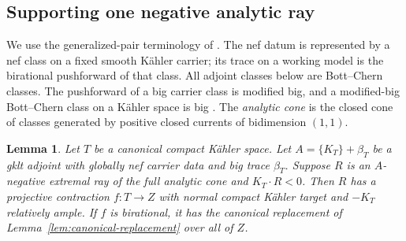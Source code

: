 \documentclass[11pt,a4paper]{article}
\numberwithin{equation}{section}
\newtheorem{lemma}[theorem]{Lemma}
\theoremstyle{definition}
\theoremstyle{remark}
\begin{document}
\subsection{Supporting one negative analytic ray}

We use the generalized-pair terminology of \cite{HX2026,OAI034}.
The nef datum is represented by a nef class on a fixed smooth
Kähler carrier; its trace on a working model is the birational
pushforward of that class. All adjoint classes below are
Bott--Chern classes. The pushforward of a big carrier class is
modified big, and a modified-big Bott--Chern class on a Kähler
space is big \cite[Definition~2.8]{HX2026}.
The \emph{analytic cone} is the closed cone of classes generated
by positive closed currents of bidimension $(1,1)$.

\begin{lemma}\label{lem:canonical-detected}
Let $T$ be a canonical compact Kähler space. Let
$A=\{K_T\}+\beta_T$ be a gklt adjoint with globally nef carrier
data and big trace $\beta_T$. Suppose $R$ is an $A$-negative
extremal ray of the full analytic cone and $K_T\cdot R<0$.
Then $R$ has a projective contraction $f:T\to Z$ with normal
compact Kähler target and $-K_T$ relatively ample.
If $f$ is birational, it has the canonical replacement of
Lemma~\ref{lem:canonical-replacement} over all of $Z$.
\end{lemma}
\end{document}
